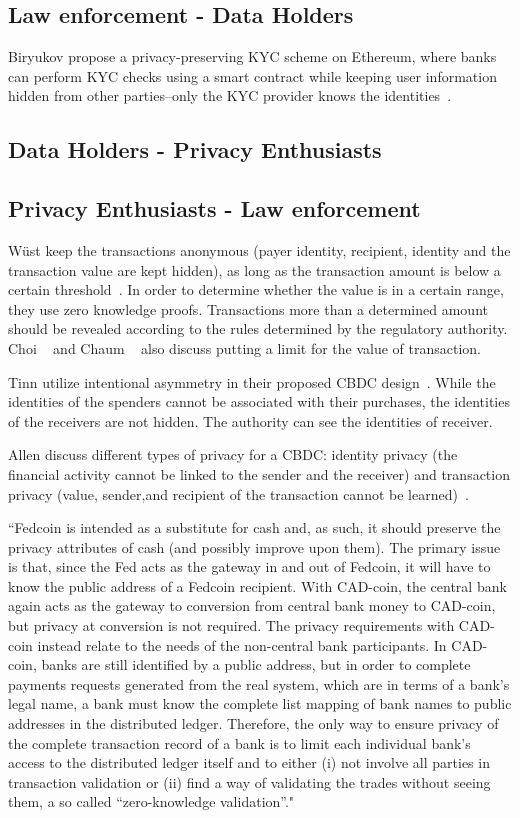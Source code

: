 \documentclass[runningheads]{llncs}
\begin{document}
\subsection{Law enforcement - Data Holders}
 Biryukov \etal propose a privacy-preserving KYC scheme on Ethereum, where banks can perform KYC checks using a smart contract while keeping user information hidden from other parties--only the KYC provider knows the identities~\cite{BKT18}.

\subsection{Data Holders - Privacy Enthusiasts}

\subsection{Privacy Enthusiasts - Law enforcement}
W{\"u}st \etal keep the transactions anonymous (payer identity, recipient, identity and the transaction value are kept hidden), as long as the transaction amount is below a certain threshold~\cite{WKCC18}. In order to determine whether the value is in a certain range, they use zero knowledge proofs. Transactions more than a determined amount should be revealed according to the rules determined by the regulatory authority. Choi \etal ~\cite{CHLRS21} and Chaum \etal ~\cite{CGM21} also discuss putting a limit for the value of transaction.

Tinn \etal utilize intentional asymmetry in their proposed CBDC design~\cite{TB21}. While the identities of the spenders cannot be associated with their purchases, the identities of the receivers are not hidden. The authority can see the identities of receiver.

Allen \etal discuss different types of privacy for a CBDC: identity privacy (the financial activity cannot be linked to the sender and the receiver) and transaction privacy (value, sender,and recipient of the transaction cannot be learned)~\cite{ACEF20}.

``Fedcoin is intended as a substitute for cash and, as such, it should
preserve the privacy attributes of cash (and possibly improve upon them). The primary issue is that, since the Fed acts as the gateway in and out of Fedcoin,
it will have to know the public address of a Fedcoin recipient. With CAD-coin, the central bank again acts as the gateway to conversion from central bank
money to CAD-coin, but privacy at conversion is not required.  The privacy requirements with CAD-coin instead relate to the needs of the non-central bank participants.  In CAD-coin, banks are still identified by a public address, but in order to complete
payments requests generated from the real system, which are in terms of a bank’s legal name, a bank must know the complete list mapping of bank names to public addresses in the distributed ledger. Therefore, the only way to ensure privacy of the complete transaction record of a bank is to limit each individual bank’s access to the distributed ledger itself and to either (i) not involve all parties in transaction validation or (ii) find a way of validating the trades without seeing them, a so called “zero-knowledge validation”."~\cite{GR16}
\end{document}
